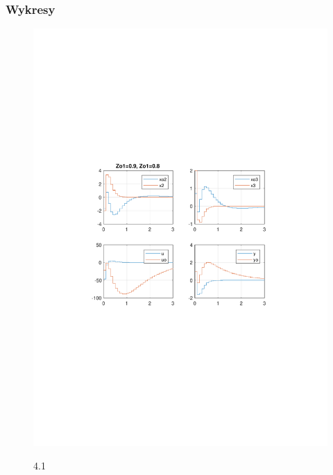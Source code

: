 \documentclass{article}
\begin{document}
\subsubsection{Wykresy}
\begin{figure}[H]
\includegraphics[clip, trim=2cm 10cm 2cm 9.5cm, width=1.00\textwidth]{../rys/zad4_rys1.pdf}
\label{fig:rys4.1}
\caption{4.1}
\end{figure}
\end{document}
